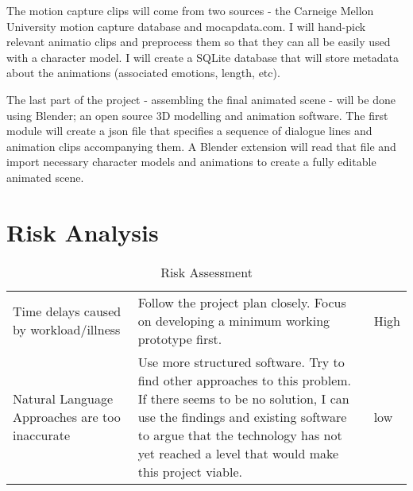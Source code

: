 The motion capture clips will come from two sources - the Carneige Mellon University motion capture database and mocapdata.com. I will hand-pick relevant animatio clips and preprocess them so that they can all be easily used with a character model. I will create a SQLite database that will store metadata about the animations (associated emotions, length, etc).

The last part of the project - assembling the final animated scene - will be done using Blender; an open source 3D modelling and animation software. The first module will create a json file that specifies a sequence of dialogue lines and animation clips accompanying them. A Blender extension will read that file and import necessary character models and animations to create a fully editable animated scene.

\section{Risk Analysis}

\begin{table}[!ht]
	\centering
	\small
	
	\begin{tabular}{ |p{11em} |p{23.8em}|p{4em}| }
	 \hline
		\thead{Risk} & \thead{Mitigation} & \thead{Level} \\
	 \hline
	 	Time delays caused by workload/illness & Follow the project plan closely. Focus on developing a minimum working prototype first. & High \\
	 \hline
		Natural Language Approaches are too inaccurate & Use more structured software. Try to find other approaches to this problem. If there seems to be no solution, I can use the findings and existing software to argue that the technology has not yet reached a level that would make this project viable.  &  low \\
	\hline
	\end{tabular}

	 \caption{Risk Assessment}
	 \label{tab:riskassessment}
	 
\end{table}